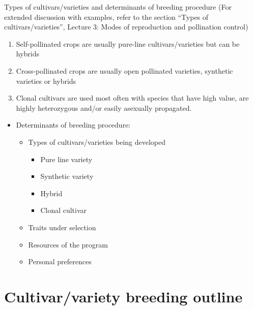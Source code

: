 \documentclass[11pt,ignorenonframetext,aspectratio=169]{beamer}
\providecommand{\tightlist}{%
  \setlength{\itemsep}{0pt}\setlength{\parskip}{0pt}}
\begin{document}
\begin{frame}{Types of cultivars/varieties and determinants of breeding
procedure}
\protect\hypertarget{types-of-cultivarsvarieties-and-determinants-of-breeding-procedure}{}
(For extended discussion with examples, refer to the section ``Types of
cultivars/varieties'', Lecture 3: Modes of reproduction and pollination
control)

\begin{enumerate}
\tightlist
\item
  Self-pollinated crops are usually pure-line cultivars/varieties but
  can be hybrids
\item
  Cross-pollinated crops are usually open pollinated varieties,
  synthetic varieties or hybrids
\item
  Clonal cultivars are used most often with species that have high
  value, are highly heterozygous and/or easily asexually propagated.
\end{enumerate}

\begin{itemize}
\tightlist
\item
  Determinants of breeding procedure:

  \begin{itemize}
  \tightlist
  \item
    Types of cultivars/varieties being developed

    \begin{itemize}
    \tightlist
    \item
      Pure line variety
    \item
      Synthetic variety
    \item
      Hybrid
    \item
      Clonal cultivar
    \end{itemize}
  \item
    Traits under selection
  \item
    Resources of the program
  \item
    Personal preferences
  \end{itemize}
\end{itemize}
\end{frame}

\hypertarget{cultivarvariety-breeding-outline}{%
\section{Cultivar/variety breeding
outline}\label{cultivarvariety-breeding-outline}}
\end{document}
